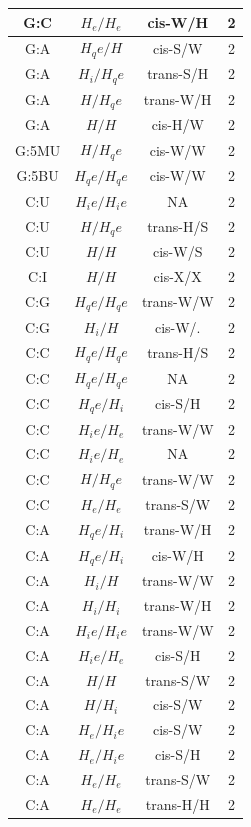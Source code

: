 \begin{center}
\begin{longtable}{c|c|c|c}
G:C & $H_e/H_e$ & cis-W/H & 2 \\  \hline
G:A & $H_qe/H$ & cis-S/W & 2 \\  \hline
G:A & $H_i/H_qe$ & trans-S/H & 2 \\  \hline
G:A & $H/H_qe$ & trans-W/H & 2 \\  \hline
G:A & $H/H$ & cis-H/W & 2 \\  \hline
G:5MU & $H/H_qe$ & cis-W/W & 2 \\  \hline
G:5BU & $H_qe/H_qe$ & cis-W/W & 2 \\  \hline
C:U & $H_ie/H_ie$ & NA & 2 \\  \hline
C:U & $H/H_qe$ & trans-H/S & 2 \\  \hline
C:U & $H/H$ & cis-W/S & 2 \\  \hline
C:I & $H/H$ & cis-X/X & 2 \\  \hline
C:G & $H_qe/H_qe$ & trans-W/W & 2 \\  \hline
C:G & $H_i/H$ & cis-W/. & 2 \\  \hline
C:C & $H_qe/H_qe$ & trans-H/S & 2 \\  \hline
C:C & $H_qe/H_qe$ & NA & 2 \\  \hline
C:C & $H_qe/H_i$ & cis-S/H & 2 \\  \hline
C:C & $H_ie/H_e$ & trans-W/W & 2 \\  \hline
C:C & $H_ie/H_e$ & NA & 2 \\  \hline
C:C & $H/H_qe$ & trans-W/W & 2 \\  \hline
C:C & $H_e/H_e$ & trans-S/W & 2 \\  \hline
C:A & $H_qe/H_i$ & trans-W/H & 2 \\  \hline
C:A & $H_qe/H_i$ & cis-W/H & 2 \\  \hline
C:A & $H_i/H$ & trans-W/W & 2 \\  \hline
C:A & $H_i/H_i$ & trans-W/H & 2 \\  \hline
C:A & $H_ie/H_ie$ & trans-W/W & 2 \\  \hline
C:A & $H_ie/H_e$ & cis-S/H & 2 \\  \hline
C:A & $H/H$ & trans-S/W & 2 \\  \hline
C:A & $H/H_i$ & cis-S/W & 2 \\  \hline
C:A & $H_e/H_ie$ & cis-S/W & 2 \\  \hline
C:A & $H_e/H_ie$ & cis-S/H & 2 \\  \hline
C:A & $H_e/H_e$ & trans-S/W & 2 \\  \hline
C:A & $H_e/H_e$ & trans-H/H & 2 \\  \hline

\end{longtable}
\end{center}
